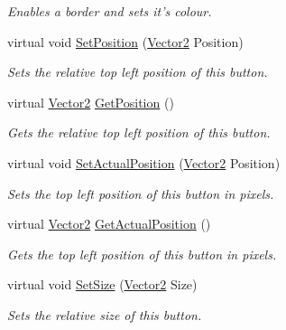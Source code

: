 \begin{DoxyCompactItemize}
\begin{DoxyCompactList}\small\item\em Enables a border and sets it's colour. \item\end{DoxyCompactList}\item 
virtual void \hyperlink{classphys_1_1UI_1_1Button_aadb9b867ceccad8313591ae5e434274d}{SetPosition} (\hyperlink{classphys_1_1Vector2}{Vector2} Position)
\begin{DoxyCompactList}\small\item\em Sets the relative top left position of this button. \item\end{DoxyCompactList}\item 
virtual \hyperlink{classphys_1_1Vector2}{Vector2} \hyperlink{classphys_1_1UI_1_1Button_adfa08ace813b88cae114e18f88942642}{GetPosition} ()
\begin{DoxyCompactList}\small\item\em Gets the relative top left position of this button. \item\end{DoxyCompactList}\item 
virtual void \hyperlink{classphys_1_1UI_1_1Button_a90ef37a2fa1645298237733918455814}{SetActualPosition} (\hyperlink{classphys_1_1Vector2}{Vector2} Position)
\begin{DoxyCompactList}\small\item\em Sets the top left position of this button in pixels. \item\end{DoxyCompactList}\item 
virtual \hyperlink{classphys_1_1Vector2}{Vector2} \hyperlink{classphys_1_1UI_1_1Button_a0b991ada87707d8d951dae7c0e3246f6}{GetActualPosition} ()
\begin{DoxyCompactList}\small\item\em Gets the top left position of this button in pixels. \item\end{DoxyCompactList}\item 
virtual void \hyperlink{classphys_1_1UI_1_1Button_a3f610782e5f84ddc315d9db6ef5f9109}{SetSize} (\hyperlink{classphys_1_1Vector2}{Vector2} Size)
\begin{DoxyCompactList}\small\item\em Sets the relative size of this button. \item\end{DoxyCompactList}\item 

\end{DoxyCompactItemize}
